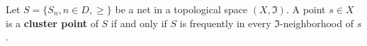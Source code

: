 Let $S = \{S_n, n \in D, \geq\}$ be a net in a topological space $(X, \mathfrak{I})$. A point $s \in X$ is a \textbf{cluster point} of $S$ if and only if $S$ is frequently in every $\mathfrak{I}$-neighborhood of $s$.
